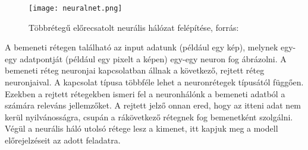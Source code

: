 \begin{figure}[H]
  \centering
  \texttt{[image: neuralnet.png]}
  \caption{Többrétegű előrecsatolt neurális hálózat felépítése, forrás: \cite{deeplearningbook}}
\end{figure}

A bemeneti rétegen található az input adatunk (például egy kép), melynek egy-egy adatpontját (például egy pixelt a képen) egy-egy neuron fog ábrázolni. A bemeneti réteg neuronjai kapcsolatban állnak a következő, rejtett réteg neuronjaival. A kapcsolat típusa többféle lehet a neuronrétegek típusától függően. Ezekben a rejtett rétegekben ismeri fel a neuronhálónk a bemeneti adatból a számára releváns jellemzőket. A rejtett jelző onnan ered, hogy az itteni adat nem kerül nyilvánosságra, csupán a rákövetkező rétegnek fog bemenetként szolgálni. Végül a neurális háló utolsó rétege lesz a kimenet, itt kapjuk meg a modell előrejelzéseit az adott feladatra. \cite{deeplearningbook} 


